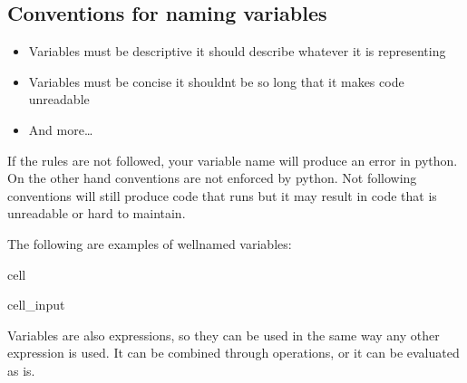 \documentclass[letterpaper,10pt,english]{jupyterBook}
\begin{document}
\subsection{Conventions for naming variables}
\label{\detokenize{expressions:conventions-for-naming-variables}}\begin{itemize}
\item {} 
\sphinxAtStartPar
Variables must be descriptive \sphinxhyphen{} it should describe whatever it is representing

\item {} 
\sphinxAtStartPar
Variables must be concise \sphinxhyphen{} it shouldnt be so long that it makes code unreadable

\item {} 
\sphinxAtStartPar
And more…

\end{itemize}

\sphinxAtStartPar
If the rules are not followed, your variable name will produce an error in python. On the other hand conventions are not enforced by python. Not following conventions will still produce code that runs but it may result in code that is unreadable or hard to maintain.

\sphinxAtStartPar
The following are examples of well\sphinxhyphen{}named variables:

\begin{sphinxuseclass}{cell}\begin{sphinxVerbatimInput}

\begin{sphinxuseclass}{cell_input}
\begin{sphinxVerbatim}[commandchars=\\\{\}]
  
  
  
\end{sphinxVerbatim}

\end{sphinxuseclass}\end{sphinxVerbatimInput}

\end{sphinxuseclass}
\sphinxAtStartPar
Variables are also expressions, so they can be used in the same way any other expression is used. It can be combined through operations, or it can be evaluated as is.
\end{document}
